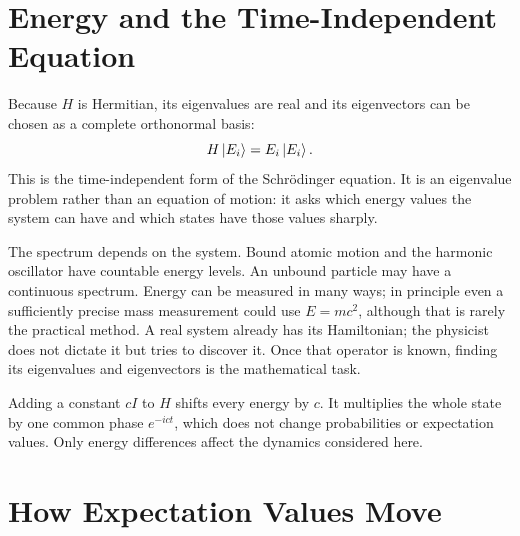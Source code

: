 \begin{classroomqa}
\end{classroomqa}

\section{Energy and the Time-Independent Equation}

Because \(H\) is Hermitian, its eigenvalues are real and its eigenvectors can be chosen as a complete orthonormal basis:
\begin{equation}
H\left\lvert E_i\right\rangle=E_i\left\lvert E_i\right\rangle.
\label{eq:l5-time-independent}
\end{equation}
This is the time-independent form of the Schr\"odinger equation. It is an eigenvalue problem rather than an equation of motion: it asks which energy values the system can have and which states have those values sharply.

The spectrum depends on the system. Bound atomic motion and the harmonic oscillator have countable energy levels. An unbound particle may have a continuous spectrum. Energy can be measured in many ways; in principle even a sufficiently precise mass measurement could use \(E=mc^2\), although that is rarely the practical method. A real system already has its Hamiltonian; the physicist does not dictate it but tries to discover it. Once that operator is known, finding its eigenvalues and eigenvectors is the mathematical task.

Adding a constant \(cI\) to \(H\) shifts every energy by \(c\). It multiplies the whole state by one common phase \(e^{-ict}\), which does not change probabilities or expectation values. Only energy differences affect the dynamics considered here.

\section{How Expectation Values Move}

